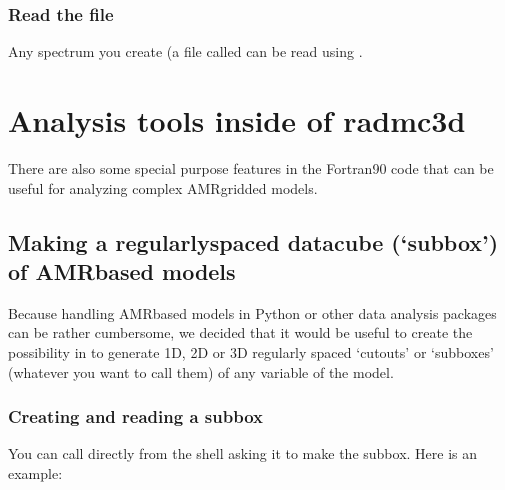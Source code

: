 \documentclass[letterpaper,10pt,english]{sphinxmanual}
\begin{document}
\subsection{Read the  file}
\label{\detokenize{pythontools:read-the-spectrum-out-file}}
Any spectrum you create (a file called  can be
read using .


\chapter{Analysis tools inside of radmc3d}
\label{\detokenize{toolsinside:analysis-tools-inside-of-radmc3d}}\label{\detokenize{toolsinside:chap-radmc3d-internal-analysis-tools}}\label{\detokenize{toolsinside::doc}}
There are also some special purpose features in the Fortran\sphinxhyphen{}90  code that can be useful for analyzing complex AMR\sphinxhyphen{}gridded models.


\section{Making a regularly\sphinxhyphen{}spaced datacube (‘subbox’) of AMR\sphinxhyphen{}based models}
\label{\detokenize{toolsinside:making-a-regularly-spaced-datacube-subbox-of-amr-based-models}}\label{\detokenize{toolsinside:sec-subbox}}
Because handling AMR\sphinxhyphen{}based models in Python or other data analysis packages can
be rather cumbersome, we decided that it would be useful to create the
possibility in  to generate 1\sphinxhyphen{}D, 2\sphinxhyphen{}D or 3\sphinxhyphen{}D regularly spaced
‘cut\sphinxhyphen{}outs’ or ‘sub\sphinxhyphen{}boxes’ (whatever you want to call them) of any variable of
the model.


\subsection{Creating and reading a subbox}
\label{\detokenize{toolsinside:creating-and-reading-a-subbox}}
You can call  directly from the shell asking it to make
the subbox. Here is an example:

\begin{sphinxVerbatim}[commandchars=\\\{\}]
            
\end{sphinxVerbatim}
\end{document}
